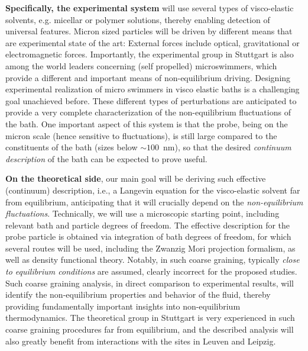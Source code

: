 \begin{workpackage}[id=WPbrown,wphases=0-48,
  short=Brown. particles, %
  title=Brownian particles in nonequilibrium baths, %
  lead=USTUTT,
  USTUTTRM=36]
\begin{wpdescription}
{\bf Specifically, the experimental system} will use several types of visco-elastic
solvents, e.g. micellar or polymer solutions, thereby enabling detection of universal
features. Micron sized particles will be driven by different means that are experimental
state of the art: External forces include optical, gravitational or electromagnetic
forces. Importantly, the experimental group in Stuttgart is also among the world leaders
concerning (self propelled) microswimmers, which provide a different and important means of
non-equilibrium driving. Designing experimental realization of micro swimmers in visco
elastic baths is a challenging goal unachieved before. These different types of
perturbations are anticipated to provide a very complete characterization of the
non-equilibrium fluctuations of the bath. One important aspect of this system is that the
probe, being on the micron scale (hence sensitive to fluctuations), is still large compared
to the constituents of the bath (sizes below $\sim 100$~nm), so that the desired {\it
  continuum description} of the bath can be expected to prove useful.

{\bf On the theoretical side}, our main goal will be deriving such effective (continuum)
description, i.e., a Langevin equation for the visco-elastic solvent far from equilibrium,
anticipating that it will crucially depend on the {\it non-equilibrium
  fluctuations}. Technically, we will use a microscopic starting point, including relevant
bath and particle degrees of freedom. The effective description for the probe particle is
obtained via integration of bath degrees of freedom, for which several routes will be used,
including the Zwanzig Mori projection formalism, as well as density functional
theory. Notably, in such coarse graining, typically {\it close to equilibrium conditions}
are assumed, clearly incorrect for the proposed studies. Such coarse graining analysis, in
direct comparison to experimental results, will identify the non-equilibrium properties and
behavior of the fluid, thereby providing fundamentally important insights into
non-equilibrium thermodynamics. The theoretical group in Stuttgart is very experienced in
such coarse graining procedures far from equilibrium, and the described analysis will also
greatly benefit from interactions with the sites in Leuven and Leipzig.


\end{wpdescription}

\begin{tasklist}


\end{tasklist}
\end{workpackage}
